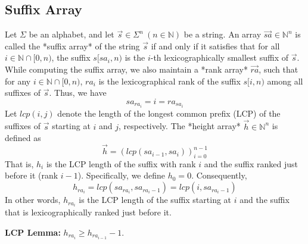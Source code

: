 \documentclass[UTF8]{article}
\begin{document}
\subsection{Suffix Array}
Let $\Sigma$ be an alphabet,
and let $\vec s \in \Sigma^n \ (n \in \mathbb{N})$ be a string.
An array $\vec{sa} \in \mathbb{N}^n$ is called the *suffix array* of
the string $\vec s$ if and only if it satisfies that
for all $i \in \mathbb{N} \cap [0, n)$,
the suffix $s[sa_i, n)$ is the $i$-th lexicographically smallest suffix of $\vec s$.
While computing the suffix array,
we also maintain a *rank array* $\vec{ra}$,
such that for any $i \in \mathbb{N} \cap [0, n)$,
$ra_i$ is the lexicographical rank of the suffix $s[i, n)$ among all suffixes of $\vec s$.
Thus, we have
$$
	sa_{ra_i}=i=ra_{sa_i}
$$
Let $lcp(i,j)$ denote the length of the longest common prefix (LCP)
of the suffixes of $\vec s$ starting at $i$ and $j$, respectively.
The *height array* $\vec h \in \mathbb{N}^n$ is defined as
$$
	\vec h=(lcp(sa_{i-1},sa_i))_{i=0}^{n-1}
$$
That is, $h_i$ is the LCP length of the suffix with rank $i$
and the suffix ranked just before it (rank $i-1$).
Specifically, we define $h_0=0$.
Consequently,
$$
	h_{ra_i}=lcp(sa_{ra_i},sa_{ra_i-1})=lcp(i,sa_{ra_i-1})
$$
In other words, $h_{ra_i}$ is the LCP length of the suffix
starting at $i$ and the suffix that is lexicographically ranked just before it.

\textbf{LCP Lemma:} $h_{ra_i}\geq h_{ra_{i-1}}-1$.
\end{document}
